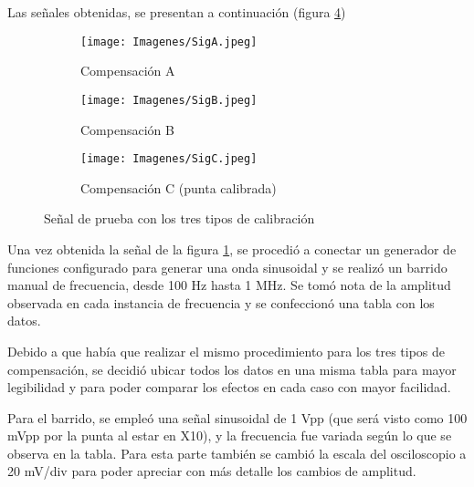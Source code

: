 Las señales obtenidas, se presentan a continuación (figura \ref{compen})


\begin{figure}[H]
    \begin{center}
        \begin{subfigure}[t]{0.5\textwidth}
        \centering  
        \texttt{[image: Imagenes/SigA.jpeg]}
        \caption{Compensación A}
        \label{fig:sigA}
    \end{subfigure}
    \hfill
    \begin{subfigure}[t]{0.49\textwidth}
        \centering
        \texttt{[image: Imagenes/SigB.jpeg]}
        \caption{Compensación B}
        \label{fig:sigB}
    \end{subfigure}
    \begin{subfigure}[t]{0.5\textwidth}
        \centering
        \texttt{[image: Imagenes/SigC.jpeg]}
        \caption{Compensación C (punta calibrada)}
        \label{fig:sigC}
    \end{subfigure}
    \caption{Señal de prueba con los tres tipos de calibración}
    \label{compen}
    \end{center}
\end{figure}

Una vez obtenida la señal de la figura \ref{fig:sigA}, se procedió a conectar un generador de funciones configurado para generar una onda sinusoidal y se realizó un barrido manual de frecuencia, desde 100 Hz hasta 1 MHz. Se tomó nota de la amplitud observada en cada instancia de frecuencia y se confeccionó una tabla con los datos. 

Debido a que había que realizar el mismo procedimiento para los tres tipos de compensación, se decidió ubicar todos los datos en una misma tabla para mayor legibilidad y para poder comparar los efectos en cada caso con mayor facilidad.

Para el barrido, se empleó una señal sinusoidal de 1 Vpp (que será visto como 100 mVpp por la punta al estar en X10), y la frecuencia fue variada según lo que se observa en la tabla. Para esta parte también se cambió la escala del osciloscopio a 20 mV/div para poder apreciar con más detalle los cambios de amplitud.


